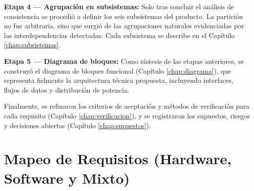 \documentclass[%
	paper=a4,
	twoside=false,
	parskip=half,
	chapterprefix=false,
	10pt,
	headings=normal,
	bibliography=totoc,
	listof=totoc,
	titlepage=on,
	captions=tableabove,
	draft=false,
]{scrbook}%
\begin{document}
\textbf{Etapa 4 — Agrupación en subsistemas:} Solo tras concluir el análisis de consistencia se procedió a definir los seis subsistemas del producto. La partición no fue arbitraria, sino que surgió de las agrupaciones naturales evidenciadas por las interdependencias detectadas. Cada subsistema se describe en el Capítulo \ref{chap:subsistemas}.

\textbf{Etapa 5 — Diagrama de bloques:} Como síntesis de las etapas anteriores, se construyó el diagrama de bloques funcional (Capítulo \ref{chap:diagrama}), que representa fielmente la arquitectura técnica propuesta, incluyendo interfaces, flujos de datos y distribución de potencia.

Finalmente, se refinaron los criterios de aceptación y métodos de verificación para cada requisito (Capítulo \ref{chap:verificacion}), y se registraron los supuestos, riesgos y decisiones abiertas (Capítulo \ref{chap:supuestos}).

\chapter{Mapeo de Requisitos (Hardware, Software y Mixto)}
\label{chap:mapeo}
\end{document}
